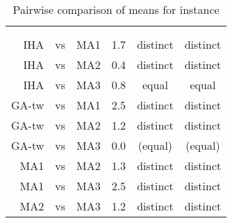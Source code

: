 \documentclass[thesis.tex]{subfiles}
\newcommand{\CurrentInstance}{}
\newcommand{\CurrentInstanceFileEscaped}{}
\newcommand{\CurrentInstanceTexEscaped}{}
\begin{document}
\begin{table}[htbp]
   \caption{Pairwise comparison of means for instance \CurrentInstance}
   \label{fig:\CurrentInstanceFileEscaped-mannwhitneyu}
   \centering\small
      \begin{tabular}{r@{\ }c@{\ }l S[table-format=2.2] c c} \toprule
         &&&                          &  \\ \cmidrule(lr){5-6}
         &&&  &  &  \\ \midrule

         \gls{IHA} &vs& \gls{MA1}   &  1.7  & distinct & distinct \\
         \gls{IHA} &vs& \gls{MA2}   &  0.4  & distinct & distinct \\
         \gls{IHA} &vs& \gls{MA3}   &  0.8  &  equal   &  equal   \\
         \gls{GA-tw} &vs& \gls{MA1} &  2.5  & distinct & distinct \\
         \gls{GA-tw} &vs& \gls{MA2} &  1.2  & distinct & distinct \\
         \gls{GA-tw} &vs& \gls{MA3} &  0.0  & (equal)  & (equal)  \\
         \gls{MA1} &vs& \gls{MA2}   &  1.3  & distinct & distinct \\
         \gls{MA1} &vs& \gls{MA3}   &  2.5  & distinct & distinct \\
         \gls{MA2} &vs& \gls{MA3}   &  1.2  & distinct & distinct \\
         \bottomrule
      \end{tabular}
\end{table}
   \renewcommand{\CurrentInstance}{\Instance{1oai}}
   \renewcommand{\CurrentInstanceFileEscaped}{1oai}
   \renewcommand{\CurrentInstanceTexEscaped}{1oai}


   \renewcommand{\CurrentInstance}{\Instance{BN\textunderscore{}0}}
   \renewcommand{\CurrentInstanceFileEscaped}{BN-0}
   \renewcommand{\CurrentInstanceTexEscaped}{BN\textunderscore{}0}


\end{document}
